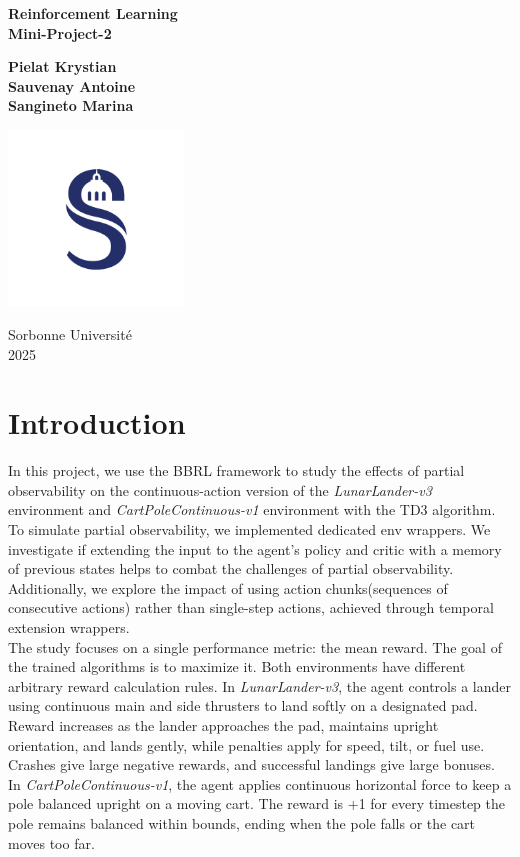 \documentclass[12pt, a4paper]{article}
\begin{document}
\thispagestyle{empty}

\begin{center}
	{\bfseries \LARGE Reinforcement Learning \\[2mm]
	Mini-Project-2}

	\vfill

	{\large
	\textbf{Pielat Krystian} \\[2mm]
	\textbf{Sauvenay Antoine} \\[2mm]
	\textbf{Sangineto Marina}
	}

	\vfill

	\includegraphics[width=0.35\textwidth]{sorbonne.png}

	\vfill

	{\large Sorbonne Université} \\[2mm]
	{\large 2025}
\end{center}

\newpage
\tableofcontents
\newpage

\section{Introduction}

In this project, we use the BBRL framework to study the effects of partial observability on the continuous-action version of the \textit{LunarLander-v3} environment and \textit{CartPoleContinuous-v1} environment with the TD3 algorithm.\\

To simulate partial observability, we implemented dedicated env wrappers. We investigate if extending the input to the agent’s policy and critic with a memory of previous states helps to combat the challenges of partial observability. Additionally, we explore the impact of using action chunks(sequences of consecutive actions) rather than single-step actions, achieved through temporal extension wrappers.\\

The study focuses on a single performance metric: the mean reward. The goal of the trained algorithms is to maximize it. Both environments have different arbitrary reward calculation rules. In \textit{LunarLander-v3}, the agent controls a lander using continuous main and side thrusters to land softly on a designated pad. Reward increases as the lander approaches the pad, maintains upright orientation, and lands gently, while penalties apply for speed, tilt, or fuel use. Crashes give large negative rewards, and successful landings give large bonuses. In \textit{CartPoleContinuous-v1}, the agent applies continuous horizontal force to keep a pole balanced upright on a moving cart. The reward is +1 for every timestep the pole remains balanced within bounds, ending when the pole falls or the cart moves too far.
\end{document}
